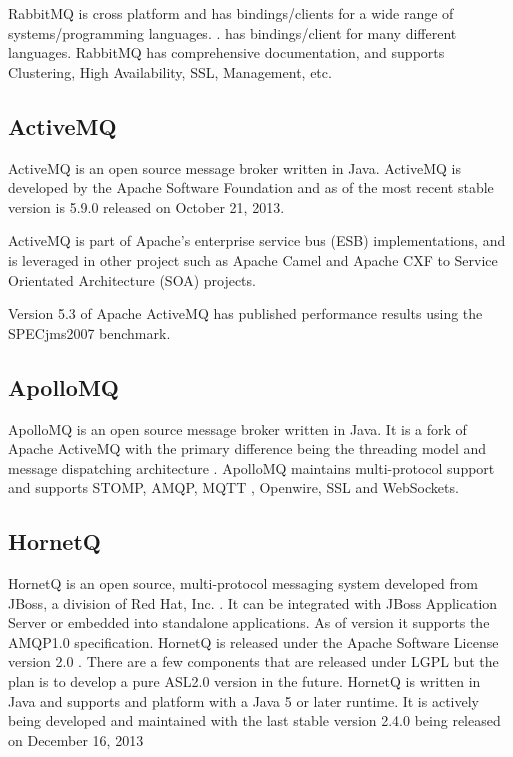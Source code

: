 \documentclass{thesis}
\begin{document}
RabbitMQ is cross platform and has bindings/clients for a wide range of systems/programming languages.  .  has bindings/client for many different languages.  RabbitMQ has comprehensive documentation, and supports Clustering, High Availability, SSL, Management, etc. 


\subsection{ActiveMQ}
ActiveMQ is an open source message broker written in Java.  ActiveMQ is developed by the Apache Software Foundation and as of  the most recent stable version is 5.9.0 released on October 21, 2013.

ActiveMQ is part of Apache's enterprise service bus (ESB) implementations, and is leveraged in other project such as Apache Camel and Apache CXF to Service Orientated Architecture (SOA) projects.

Version 5.3 of Apache ActiveMQ has published performance results using the SPECjms2007 benchmark.  


\subsection{ApolloMQ}
ApolloMQ is an open source message broker written in Java.  It is a fork of Apache ActiveMQ with the primary difference being the threading model and message dispatching architecture .  ApolloMQ maintains multi-protocol support and supports STOMP, AMQP, MQTT , Openwire, SSL and WebSockets.



\subsection{HornetQ}
HornetQ is an open source, multi-protocol messaging system developed from JBoss, a division of Red Hat, Inc. \cite{http://en.wikipedia.org/wiki/JBoss_(company)}.  It can be integrated with JBoss Application Server or embedded into standalone applications.  As of version  it supports the AMQP1.0 specification.  HornetQ is released under the Apache Software License version 2.0 .  There are a few components that are released under LGPL  but the plan is to develop a pure ASL2.0 version in the future.  HornetQ is written in Java and supports and platform with a Java 5 or later runtime.   It is actively being developed and maintained with the last stable version 2.4.0 being released on December 16, 2013 
\end{document}
